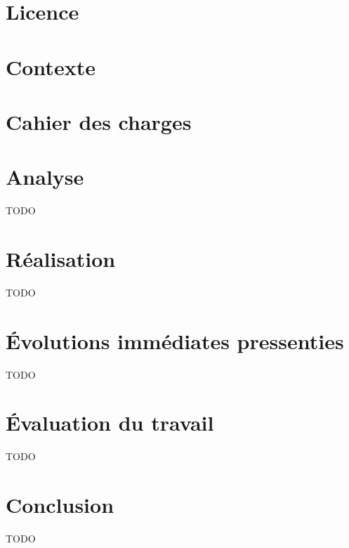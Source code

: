 \documentclass[12pt]{report}
\begin{document}

	\setcounter{page}{1}

	\chapter*{Licence}
	\clearpage

	\renewcommand{\thepage}{\roman{page}}

	\tableofcontents
	\clearpage

	\renewcommand{\thepage}{\arabic{page}}

	

	\chapter{Contexte}
	\label{ch:context}

	    

	\chapter{Cahier des charges}
	\label{ch:specifications}

		

	\chapter{Analyse}
	\label{ch:analysis}

		TODO

	\chapter{Réalisation}
	\label{ch:implementation}

		TODO

	\chapter{Évolutions immédiates pressenties}
	\label{ch:next-steps}

		TODO

	\chapter{Évaluation du travail}
	\label{ch:auto-critic}

		TODO

	\chapter{Conclusion}
	\label{ch:conclusion}

		TODO
		
	

	\printbibliography

\end{document}
